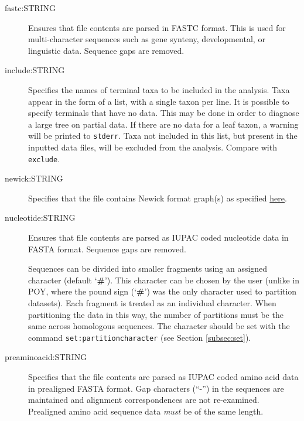 \begin{description}
		\item [fastc:STRING] Ensures that file contents are parsed in FASTC \citep{WheelerandWashburn2019}
		format. This is used for multi-character sequences such as gene synteny, developmental, 
		or linguistic data.   Sequence gaps are removed.
			
			
		\item [include:STRING] Specifies the names of terminal taxa to be included in the analysis. 
		Taxa appear in the form of a list, with a single taxon per line. It is possible to specify 
		terminals that have no data. This may be done in order to diagnose a large tree on 
		partial data. If there are no data for a leaf taxon, a warning will be printed to \texttt{stderr}. 
		Taxa not included in this list, but present in the inputted data files, will be excluded from 
		the analysis. Compare with \texttt{exclude}.
			
		\item [newick:STRING] Specifies that the file contains Newick format graph(s) as specified 
		\href{https://evolution.genetics.washington.edu/phylip/newick_doc.html}{here}.
			
		\item [nucleotide:STRING] Ensures that file contents are parsed as IUPAC coded nucleotide data 
		in FASTA \citep{PearsonandLipman1988} format.   Sequence gaps are removed.
		
		\begin{tcolorbox}[enhanced,fit to height=3.5cm,
  		colback=JungleGreen!40!black!2!white,colframe=JungleGreen!70!black,title=Note,
  		drop fuzzy shadow]
  		Sequences can be divided into smaller fragments using an assigned character (default `\textbf{\#}'). This 
		character can be chosen by the user (unlike in POY, where the pound sign (`\textbf{\#}') was 
		the only character used to partition datasets). Each fragment is treated as an individual character. When 
		partitioning the data in this way, the number of partitions must be the same across 
		homologous sequences. The character should be set with the command 
		\texttt{set:partitioncharacter} (see Section \ref{subsec:set}).
		\end{tcolorbox}
			
		\item [preaminoacid:STRING] Specifies that the file contents are parsed as IUPAC coded amino 
		acid data in prealigned FASTA \citep{PearsonandLipman1988} format. Gap characters (``-'') 
		in the sequences are maintained and alignment correspondences are not re-examined.
		Prealigned amino acid sequence data \textit{must} be of the same length.
	

\end{description}
